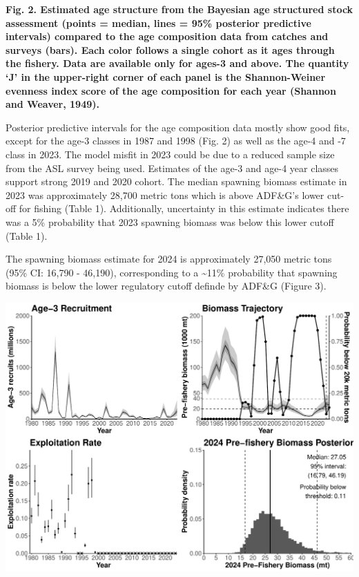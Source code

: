 \documentclass[
  11pt,
]{article}
\begin{document}
\textbf{Fig. 2. Estimated age structure from the Bayesian age structured
stock assessment (points = median, lines = 95\% posterior predictive
intervals) compared to the age composition data from catches and surveys
(bars). Each color follows a single cohort as it ages through the
fishery. Data are available only for ages-3 and above. The quantity `J'
in the upper-right corner of each panel is the Shannon-Weiner evenness
index score of the age composition for each year (Shannon and Weaver,
1949).}

Posterior predictive intervals for the age composition data mostly show
good fits, except for the age-3 classes in 1987 and 1998 (Fig. 2) as
well as the age-4 and -7 class in 2023. The model misfit in 2023 could
be due to a reduced sample size from the ASL survey being used.
Estimates of the age-3 and age-4 year classes support strong 2019 and
2020 cohort. The median spawning biomass estimate in 2023 was
approximately 28,700 metric tons which is above ADF\&G's lower cut-off
for fishing (Table 1). Additionally, uncertainty in this estimate
indicates there was a 5\% probability that 2023 spawning biomass was
below this lower cutoff (Table 1).

The spawning biomass estimate for 2024 is approximately 27,050 metric
tons (95\% CI: 16,790 - 46,190), corresponding to a \textasciitilde11\%
probability that spawning biomass is below the lower regulatory cutoff
definde by ADF\&G (Figure 3).

\begin{center}\includegraphics[width=1\linewidth]{figures/management_outputs} \end{center}
\end{document}
